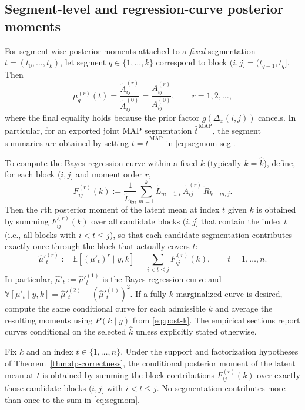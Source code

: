 \subsection{Segment-level and regression-curve posterior moments}
For segment-wise posterior moments attached to a \emph{fixed} segmentation
$t=(t_0,\dots,t_k)$, let segment $q\in\{1,\dots,k\}$ correspond to block
$(i,j]=(t_{q-1},t_q]$. Then
\begin{equation}
\mu^{(r)}_q(t)
 = \frac{\widetilde{A}^{(r)}_{ij}}{\widetilde{A}^{(0)}_{ij}}
 = \frac{A^{(r)}_{ij}}{A^{(0)}_{ij}},
\qquad r=1,2,\dots,
\label{eq:segmom-seg}
\end{equation}
where the final equality holds because the prior factor $g(\Delta_x(i,j))$ cancels. In particular, for
an exported joint MAP segmentation $\widehat{t}^{\,\mathrm{MAP}}$, the segment summaries are obtained by
setting $t=\widehat{t}^{\,\mathrm{MAP}}$ in \eqref{eq:segmom-seg}.

To compute the Bayes regression curve within a fixed $k$ (typically $k=\widehat{k}$),
define, for each block $(i,j]$ and moment order $r$,
\[
F^{(r)}_{ij}(k)
 := \frac{1}{\widetilde{L}_{k n}}\sum_{m=1}^k
       \widetilde{L}_{m-1,i}\,\widetilde{A}^{(r)}_{ij}\,\widetilde{R}_{k-m,j}.
\]
Then the $r$th posterior moment of the latent mean at index $t$ given $k$ is obtained by summing
$F^{(r)}_{ij}(k)$ over all candidate blocks $(i,j]$ that contain the index $t$ (i.e., all blocks
with $i<t\le j$), so that each candidate segmentation contributes exactly once through the block
that actually covers $t$:
\begin{equation}
\widehat{\mu}'^{(r)}_t
 := \mathbb{E}[(\mu'_t)^r\mid y,k]
 = \sum_{i<t\le j} F^{(r)}_{ij}(k),
\qquad t=1,\dots,n.
\label{eq:segmom}
\end{equation}
In particular, $\widehat{\mu}'_t := \widehat{\mu}'^{(1)}_t$ is the Bayes regression curve and
$\mathbb{V}[\mu'_t\mid y,k]
 = \widehat{\mu}'^{(2)}_t - (\widehat{\mu}'^{(1)}_t)^2$.
If a fully $k$-marginalized curve is desired, compute the same conditional curve for each admissible
$k$ and average the resulting moments using $P(k\mid y)$ from \eqref{eq:post-k}. The empirical
sections report curves conditional on the selected $\widehat k$ unless explicitly stated otherwise.

\begin{proposition}
\label{prop:block-covering-decomposition}
Fix $k$ and an index $t\in\{1,\dots,n\}$. Under the support and factorization hypotheses of
Theorem~\ref{thm:dp-correctness}, the conditional posterior moment of the latent mean at $t$ is
obtained by summing the block contributions $F^{(r)}_{ij}(k)$ over exactly those candidate blocks
$(i,j]$ with $i<t\le j$. No segmentation contributes more than once to the sum in
\eqref{eq:segmom}.
\end{proposition}

